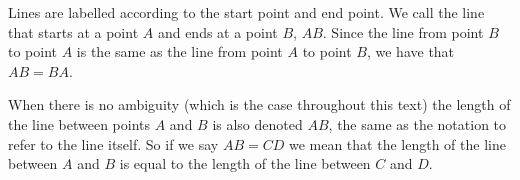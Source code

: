       \label{m39370*id313170}Lines are labelled according to the start point and end point. We call the line that starts at a point \begin{math}A\end{math} and ends at a point \begin{math}B\end{math}, \begin{math}AB\end{math}. Since the line from point \begin{math}B\end{math} to point \begin{math}A\end{math} is the same as the line from point \begin{math}A\end{math} to point \begin{math}B\end{math}, we have that \begin{math}AB=BA\end{math}.\par 
      \label{m39370*id313175}When there is no ambiguity (which is the case throughout this text) the length of the line between points \begin{math}A\end{math} and \begin{math}B\end{math} is also denoted \begin{math}AB\end{math}\hspace{1ex}, the same as the notation to refer to the line itself. So if we say \begin{math}AB=CD\end{math}\hspace{1ex} we mean that the length of the line between \begin{math}A\end{math} and \begin{math}B\end{math} is equal to the length of the line between \begin{math}C\end{math} and \begin{math}D\end{math}.

